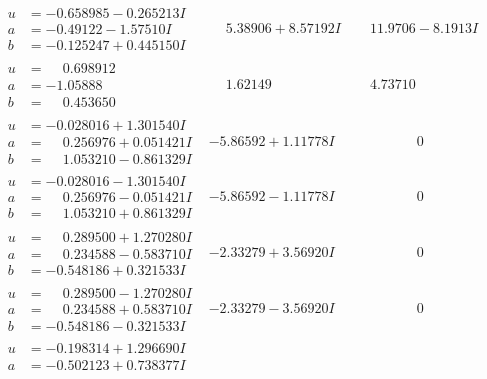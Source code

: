 \documentclass[1p]{elsarticle_modified}
\theoremstyle{definition}
\begin{document}
$$\begin{array}{c|c|c}
 \hline 
\begin{aligned}
u &= -0.658985 - 0.265213 I \\
a &= -0.49122 - 1.57510 I \\
b &= -0.125247 + 0.445150 I\end{aligned}
 & \phantom{-}5.38906 + 8.57192 I & \phantom{-}11.9706 - 8.1913 I \\ \hline\begin{aligned}
u &= \phantom{-}0.698912\phantom{ +0.000000I} \\
a &= -1.05888\phantom{ +0.000000I} \\
b &= \phantom{-}0.453650\phantom{ +0.000000I}\end{aligned}
 & \phantom{-}1.62149\phantom{ +0.000000I} & \phantom{-}4.73710\phantom{ +0.000000I} \\ \hline\begin{aligned}
u &= -0.028016 + 1.301540 I \\
a &= \phantom{-}0.256976 + 0.051421 I \\
b &= \phantom{-}1.053210 - 0.861329 I\end{aligned}
 & -5.86592 + 1.11778 I & \phantom{-0.000000 } 0 \\ \hline\begin{aligned}
u &= -0.028016 - 1.301540 I \\
a &= \phantom{-}0.256976 - 0.051421 I \\
b &= \phantom{-}1.053210 + 0.861329 I\end{aligned}
 & -5.86592 - 1.11778 I & \phantom{-0.000000 } 0 \\ \hline\begin{aligned}
u &= \phantom{-}0.289500 + 1.270280 I \\
a &= \phantom{-}0.234588 - 0.583710 I \\
b &= -0.548186 + 0.321533 I\end{aligned}
 & -2.33279 + 3.56920 I & \phantom{-0.000000 } 0 \\ \hline\begin{aligned}
u &= \phantom{-}0.289500 - 1.270280 I \\
a &= \phantom{-}0.234588 + 0.583710 I \\
b &= -0.548186 - 0.321533 I\end{aligned}
 & -2.33279 - 3.56920 I & \phantom{-0.000000 } 0 \\ \hline\begin{aligned}
u &= -0.198314 + 1.296690 I \\
a &= -0.502123 + 0.738377 I \\

\end{aligned}
\end{array}$$
\end{document}

